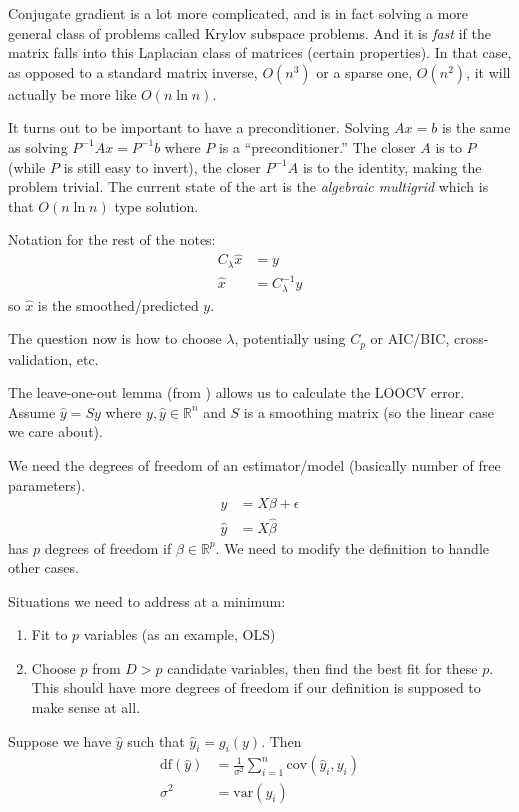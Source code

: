 \documentclass{article}
\begin{document}
Conjugate gradient is a lot more complicated, and is in fact solving a more general class of problems called Krylov subspace
problems. And it is \emph{fast} if the matrix falls into this
Laplacian class of matrices (certain properties). In that case, as opposed to a standard matrix inverse, $O(n^3)$ or
a sparse one, $O(n^2)$, it will actually be more like $O(n \ln n)$.

It turns out to be important to have a preconditioner. Solving $Ax=b$ is the same as solving $P^{-1}Ax=P^{-1}b$
where $P$ is a ``preconditioner.'' The closer $A$ is to $P$ (while $P$ is still easy to invert), the closer $P^{-1}A$ 
is to the identity, making the problem trivial. The current state of the art is the \emph{algebraic multigrid}
which is that $O(n \ln n)$ type solution.

\vspace{5ex} 

Notation for the rest of the notes:
\begin{align*}
C_\lambda\hat{x}&=y\\
\hat{x}&=C_\lambda^{-1}y
\end{align*}
so $\hat{x}$ is the smoothed/predicted $y$.

The question now is how to choose $\lambda$, potentially using $C_p$ or AIC/BIC, cross-validation, etc.

The leave-one-out lemma (from \cite{trevor2001elements})
allows us to calculate the LOOCV error. Assume $\hat{y}=Sy$
where $y,\hat{y}\in \mathbb{R}^n$ and $S$ is a smoothing matrix (so the linear case we care about).

We need the degrees of freedom of an estimator/model (basically number of free parameters).
\begin{align*}
y&=X\beta + \epsilon\\
\hat{y}&=X\hat{\beta}
\end{align*}
has $p$ degrees of freedom if $\beta\in\mathbb{R}^p$. We need to modify the definition to handle other cases.

Situations we need to address at a minimum:
\begin{enumerate}[1.]
\item Fit to $p$ variables (as an example, OLS)
\item Choose $p$ from $D>p$ candidate variables, then find the best fit for these $p$. This should have more degrees
of freedom if our definition is supposed to make sense at all.
\end{enumerate}

Suppose we have $\hat{y}$ such that $\hat{y}_i=g_i(y)$. Then
\begin{align*}
\textrm{df}(\hat{y}) &= \frac{1}{\sigma^2} \sum_{i=1}^n \textrm{cov}(\hat{y}_i, y_i)\\
\sigma^2&=\textrm{var}(y_i)
\end{align*}
\end{document}
